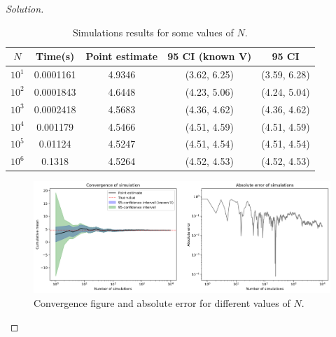 \documentclass[a4paper,10pt, notitlepage]{report}
\begin{document}
\begin{enumerate}
\begin{proof}[Solution]
\begin{table}[ht]
    \centering
    \begin{tabular}{|c|c|c|c|c|}
    \hline
    \textbf{$N$} & \textbf{Time(s)} & \textbf{Point estimate} & \textbf{95 CI (known V)} & \textbf{95 CI} \\ \hline
    $10^1$          & 0.0001161             & 4.9346                  & (3.62, 6.25)             & (3.59, 6.28)               \\ \hline
    $10^2$          & 0.0001843             & 4.6448                  & (4.23, 5.06)             & (4.24, 5.04)               \\ \hline
    $10^3$         & 0.0002418             & 4.5683                  & (4.36, 4.62)             & (4.36, 4.62)               \\ \hline
    $10^4$        & 0.001179              & 4.5466                  & (4.51, 4.59)             & (4.51, 4.59)               \\ \hline
    $10^5$       & 0.01124               & 4.5247                  & (4.51, 4.54)             & (4.51, 4.54)               \\ \hline
    $10^6$      & 0.1318                & 4.5264                  & (4.52, 4.53)             & (4.52, 4.53)               \\ \hline
    \end{tabular}
\caption{Simulations results for some values of $N$.}
\label{tab:simulations}
\end{table}

\begin{figure}[ht]
    \centering
    \includegraphics[width=\textwidth]{figure_simulation.png}
    \caption{Convergence figure and absolute error for different values of $N$.}
    \label{fig:simulations}
\end{figure}

\end{proof}

\end{enumerate}



% 


\end{document}
